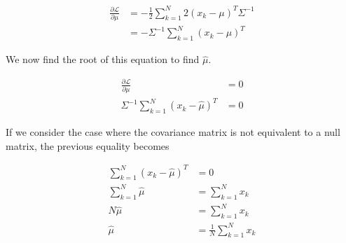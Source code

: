\documentclass[a4paper, 10pt, twoside]{article}
\begin{document}
\begin{align*}
    \frac{\partial \mathcal{L}}{\partial \mu}
     & =
    -\frac{1}{2} \sum_{k=1}^N 2 (x_k-\mu)^T \Sigma^{-1} \\
     & =
    - \Sigma^{-1} \sum_{k=1}^N (x_k-\mu)^T
\end{align*}

We now find the root of this equation to find $\hat{\mu}$.

\begin{align*}
    \frac{\partial \mathcal{L}}{\partial \mu}  & = 0 \\
    \Sigma^{-1} \sum_{k=1}^N (x_k-\hat{\mu})^T & = 0
\end{align*}

If we consider the case where the covariance matrix is not equivalent to a null matrix, the previous equality becomes

\begin{align*}
    \sum_{k=1}^N (x_k-\hat{\mu})^T & = 0                            \\
    \sum_{k=1}^N\hat{\mu}          & = \sum_{k=1}^N x_k             \\
    N\hat{\mu}                     & = \sum_{k=1}^N x_k             \\
    \hat{\mu}                      & = \frac{1}{N} \sum_{k=1}^N x_k \\
\end{align*}
\end{document}
